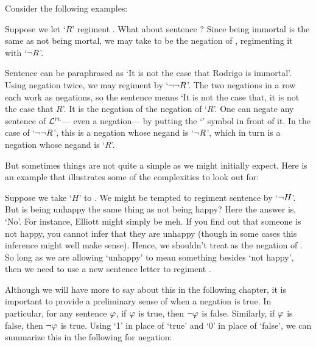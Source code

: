 
Consider the following examples:

\begin{earg} \label{rodrigo}
\end{earg}

Suppose we let `$R$' regiment .
What about sentence ?
Since being immortal is the same as not being mortal, we may take  to be the negation of , regimenting it with `$\neg R$'.

Sentence  can be paraphrased as `It is not the case that Rodrigo is immortal'.
Using negation twice, we may regiment  by `$\neg \neg R$'.
The two negations in a row each work as negations, so the sentence means `It is not the case that, it is not the case that $R$'.
It is the negation of the negation of `$R$'.
One can negate any sentence of $\mathcal{L}^{\textsc{pl}}$--- even a negation--- by putting the `\enot' symbol in front of it.
In the case of `$\neg\neg R$', this is a negation whose negand is `$\neg R$', which in turn is a negation whose negand is `$R$'.

But sometimes things are not quite a simple as we might initially expect.
Here is an example that illustrates some of the complexities to look out for:

\begin{earg} \label{elliott}
\end{earg}

Suppose we take `$H$' to .
We might be tempted to regiment sentence  by `$\neg{H}$'.
But is being unhappy the same thing as not being happy? 
Here the answer is, `No'.
For instance, Elliott might simply be meh.
If you find out that someone is not happy, you cannot infer that they are unhappy (though in some cases this inference might well make sense).
Hence, we shouldn't treat  as the negation of .
So long as we are allowing `unhappy' to mean something besides `not happy', then we need to use a new sentence letter to regiment .

Although we will have more to say about this in the following chapter, it is important to provide a preliminary sense of when a negation is true.
In particular, for any sentence $\varphi$, if $\varphi$ is true, then $\neg\varphi$ is false.
Similarly, if $\varphi$ is false, then $\neg\varphi$ is true.
Using `1' in place of `true' and `0' in place of `false', we can summarize this in the following  for negation:

